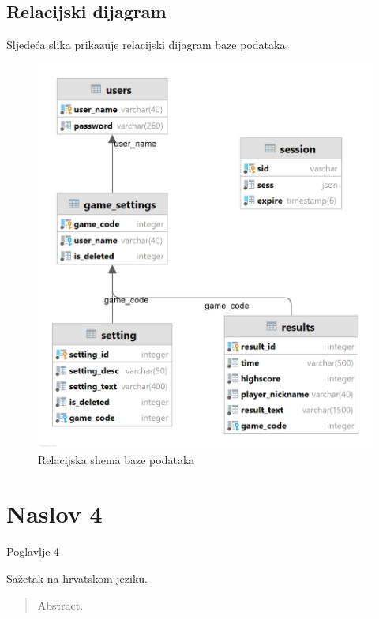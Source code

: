\documentclass[times, utf8, zavrsni]{fer}
\begin{document}
	\section{Relacijski dijagram}
		Sljedeća slika prikazuje relacijski dijagram baze podataka.
		\begin{figure}[H]
			\includegraphics[width=\linewidth]{"slike/REL.png"} 
			\centering
			\caption{Relacijska shema baze podataka}
			\label{fig:relshema}
		\end{figure}


\chapter{Naslov 4}
Poglavlje 4




\begin{sazetak}
Sažetak na hrvatskom jeziku.

\end{sazetak}

\begin{abstract}
Abstract.

\end{abstract}
\end{document}
